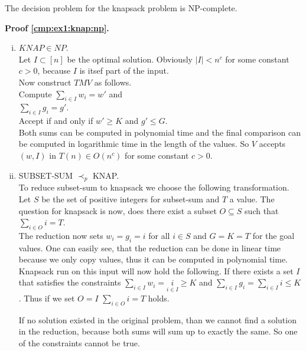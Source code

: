 \begin{lemma}\label{cmp:ex1:knap:np}
The decision problem for the knapsack problem is NP-complete.
\end{lemma}
\textbf{Proof \ref{cmp:ex1:knap:np}.}\\
\begin{enumerate}[i)]
    \item $KNAP \in NP$.\\
        Let $I \subset [n]$ be the optimal solution. Obviously $|I| < n^c$ for some constant $c>0$,
        because $I$ is itsef part of the input.\\
        Now construct $TM V$ as follows.\\
        Compute $\underset{i \in I}{\sum} w_i = w'$ and\\
        $\underset{i \in I}{\sum} g_i = g'$.\\
        Accept if and only if $w' \geq K$ and $ g' \leq G$.\\

        Both sums can be computed in polynomial time and the final comparison can be computed
        in logarithmic time in the length of the values.
        So $V$ accepts $(w,I)$ in $T(n) \in O(n^c)$ for some constant $c>0$.

    \item SUBSET-SUM $\prec_p$ KNAP.\\
        To reduce subset-sum to knapsack we choose the following transformation. Let $S$ be the set of
        positive integers for subset-sum and $T$ a value. The question for knapsack is now, does there exist
        a subset $O \subseteq S$ such that $\underset{i \in O}{\sum} i = T$.\\

        The reduction now sets $w_i = g_i = i$ for all $i \in S$ and $G = K = T$ for the goal values. One can
        easily see, that the reduction can be done in linear time because we only copy values, thus it can be computed in polynomial time. \\

        Knapsack run on this input will now hold the following. If there exists a set $I$ that satisfies the constraints
        $\underset{ i \in I}{\sum} w_i = \underset{i \in I} i \geq K$ and $\underset{i \in I}{\sum} g_i = \underset{i \in I}{\sum} i \leq K$.
        Thus if we set $O = I$ $\underset{i \in O}{\sum} i = T$ holds.

        If no solution existed in the original problem, than we cannot find a solution in the reduction, because both sums
        will sum up to exactly the same. So one of the constraints cannot be true.
\end{enumerate}


